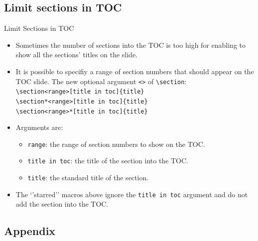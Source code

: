 \documentclass[english,sectioncirclenumberstyle]{ciadbeamer}
\begin{document}
\subsection{Limit sections in TOC}

\begin{frame}{{Limit Sections} in TOC}
	\begin{itemize}
	\item Sometimes the number of sections into the TOC is too high for enabling to show all the sections' titles on the slide.
	\item It is possible to specifiy a range of section numbers that should appear on the TOC slide. The new optional argument \texttt{<>} of \texttt{{\textbackslash}section}: \\
		\texttt{{\textbackslash}section<range>[title in toc]\{title\}} \\
		\texttt{{\textbackslash}section*<range>[title in toc]\{title\}} \\
		\texttt{{\textbackslash}section<range>*[title in toc]\{title\}}
	\vfill
	\item Arguments are: \begin{itemize}
		\item \texttt{range}: the range of section numbers to show on the TOC.
		\item \texttt{title in toc}: the title of the section into the TOC.
		\item \texttt{title}: the standard title of the section.
		\end{itemize}
	\item The `'starred'' macros above ignore the \texttt{title in toc} argument and do not add the section into the TOC.
	\end{itemize}
\end{frame}

\subsection{Appendix}
\end{document}
